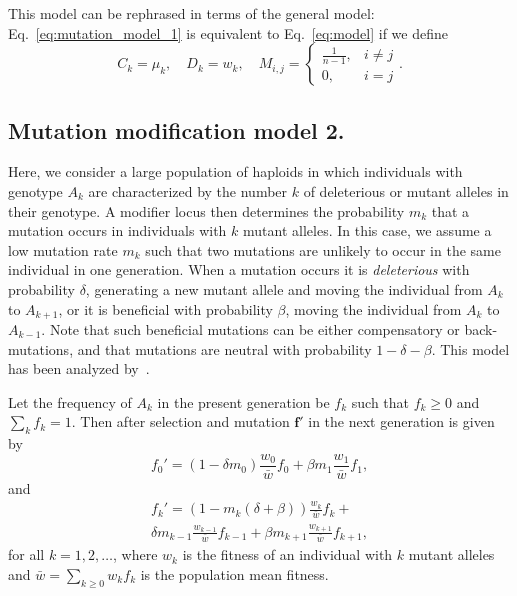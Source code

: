 \documentclass[9pt, a4paper, twocolumn]{extarticle}   	%
\let\vec\mathbf
\begin{document}
This model can be rephrased in terms of the general model: 
Eq.~\ref{eq:mutation_model_1} is equivalent to Eq.~\ref{eq:model} if we define
\begin{equation} 
C_k = \mu_k, \quad
D_k = w_k, \quad
M_{i,j} = \begin{cases}
\frac{1}{n-1}, & i \ne j \\
0, & i=j
\end{cases}.
\end{equation}

\subsection*{Mutation modification model 2.}

Here, we consider a large population of haploids in which individuals with genotype $A_k$ are characterized by the number $k$ of deleterious or mutant alleles in their genotype.
A modifier locus then determines the probability $m_k$ that a mutation occurs in individuals with $k$ mutant alleles.
In this case, we assume a low mutation rate $m_k$ such that two mutations are unlikely to occur in the same individual in one generation.
When a mutation occurs it is \emph{deleterious} with probability $\delta$, generating a new mutant allele and moving the individual from $A_k$ to $A_{k+1}$, or it is beneficial with probability $\beta$, moving the individual from $A_k$ to $A_{k-1}$.
Note that such beneficial mutations can be either compensatory or back-mutations, and that mutations are neutral with probability $1-\delta-\beta$.
This model has been analyzed by~\citet{Ram2012}.

Let the frequency of $A_k$ in the present generation be $f_k$ such that $f_k \ge 0$ and $\sum_k{f_k}=1$.
Then after selection and mutation $\vec{f'}$ in the next generation is given by
\begin{equation}
f_0' = (1 - \delta m_0) \frac{w_0}{\bar{w}} f_0 + \beta m_{1} \frac{w_{1}}{\bar{w}} f_{1},
\end{equation}
and
\begin{multline}
f_k' = (1 - m_k(\delta+\beta)) \frac{w_k}{\bar{w}} f_k + \\
\delta m_{k-1} \frac{w_{k-1}}{\bar{w}} f_{k-1} + \beta m_{k+1} \frac{w_{k+1}}{\bar{w}} f_{k+1},
\label{eq:mutation_model_2}
\end{multline}
for all $k=1,2,\ldots$, where $w_k$ is the fitness of an individual with $k$ mutant alleles and $\bar{w} = \sum_{k \ge 0}{w_k f_k}$ is the population mean fitness.
\end{document}
